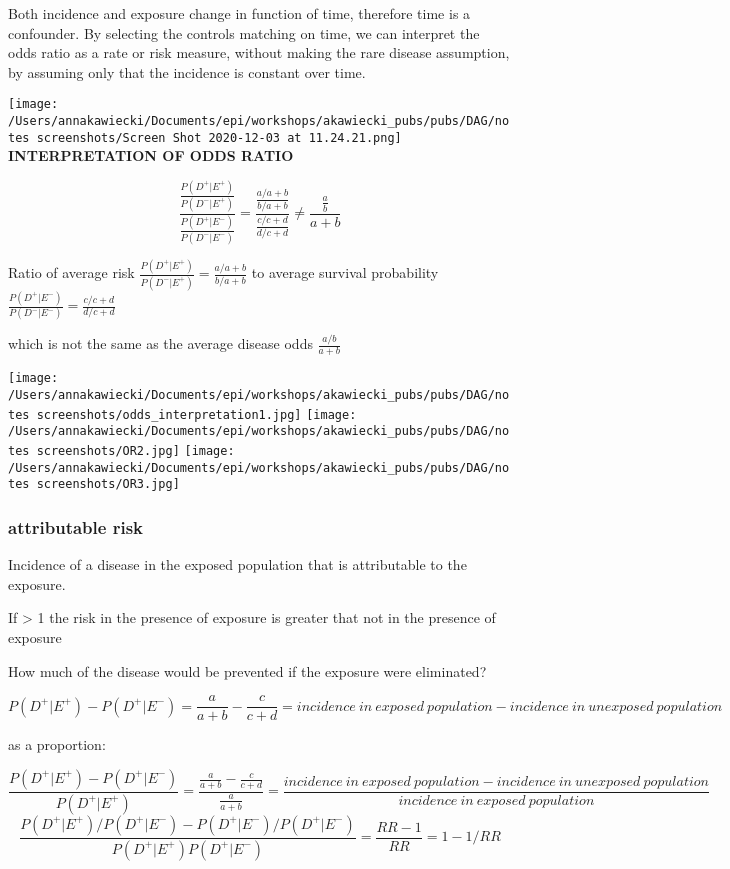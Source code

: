 \documentclass[
]{article}
\begin{document}
Both incidence and exposure change in function of time, therefore time
is a confounder. By selecting the controls matching on time, we can
interpret the odds ratio as a rate or risk measure, without making the
rare disease assumption, by assuming only that the incidence is constant
over time.

\texttt{[image: /Users/annakawiecki/Documents/epi/workshops/akawiecki\_pubs/pubs/DAG/notes screenshots/Screen Shot 2020-12-03 at 11.24.21.png]}
\textbf{INTERPRETATION OF ODDS RATIO}

\[\frac{\frac{P(D^+|E^+)}{P(D^-|E^+)}}{\frac{P(D^+|E^-)}{P(D^-|E^-)}}= \frac{\frac{a/a+b}{b/a+b}}{\frac{c/c+d}{d/c+d}} \ne \frac{\frac{a}{b}}{a+b}\]

Ratio of average risk
\(\frac{P(D^+|E^+)}{P(D^-|E^+)}= \frac{a/a+b}{b/a+b}\) to average
survival probability
\(\frac{P(D^+|E^-)}{P(D^-|E^-)}= \frac{c/c+d}{d/c+d}\)

which is not the same as the average disease odds \(\frac{a/b}{a+b}\)

\texttt{[image: /Users/annakawiecki/Documents/epi/workshops/akawiecki\_pubs/pubs/DAG/notes screenshots/odds\_interpretation1.jpg]}
\texttt{[image: /Users/annakawiecki/Documents/epi/workshops/akawiecki\_pubs/pubs/DAG/notes screenshots/OR2.jpg]}
\texttt{[image: /Users/annakawiecki/Documents/epi/workshops/akawiecki\_pubs/pubs/DAG/notes screenshots/OR3.jpg]}

\hypertarget{attributable-risk}{%
\subsubsection{attributable risk}\label{attributable-risk}}

Incidence of a disease in the exposed population that is attributable to
the exposure.

If \textgreater{} 1 the risk in the presence of exposure is greater that
not in the presence of exposure

How much of the disease would be prevented if the exposure were
eliminated?

\[{P(D^+|E^+)}-{P(D^+|E^-)}={\frac{a}{a+b}}-{\frac{c}{c+d}}={incidence\:in\:exposed\:population} -{incidence\:in\:unexposed\:population}\]

as a proportion:

\[\frac{{P(D^+|E^+)}-{P(D^+|E^-)}}{P(D^+|E^+)}=\frac{{\frac{a}{a+b}}-{\frac{c}{c+d}}}{\frac{a}{a+b}}=\frac{{incidence\:in\:exposed\:population} -{incidence\:in\:unexposed\:population}}{incidence\:in\:exposed\:population}\]
\[\frac{{P(D^+|E^+)}/{P(D^+|E^-)}-{P(D^+|E^-)}/{P(D^+|E^-)}}{P(D^+|E^+){P(D^+|E^-)}}= \frac{RR - 1}{RR}= 1- 1/RR\]
\end{document}
